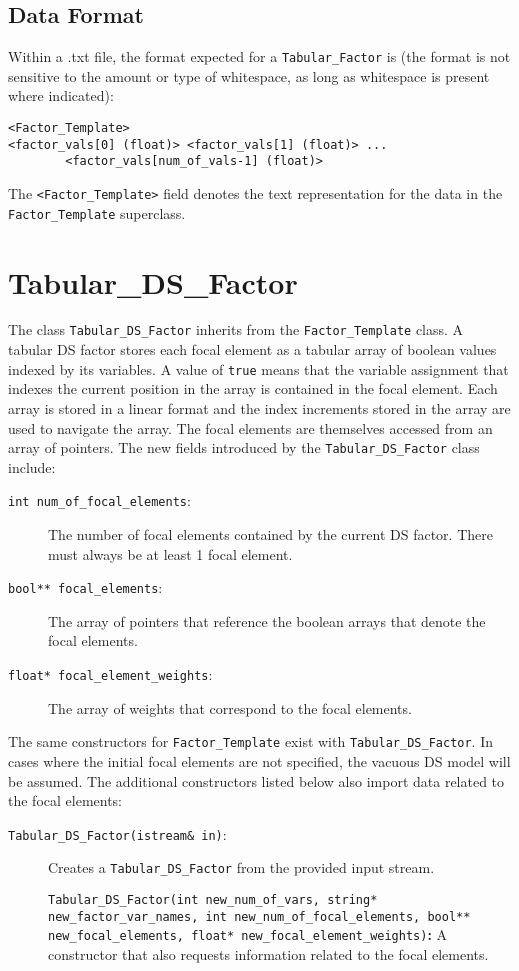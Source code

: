 \documentclass{article}
\begin{document}
\subsection{Data Format}

Within a .txt file, the format expected for a \texttt{Tabular\_Factor} is (the format is not sensitive to the amount or type of whitespace, as long as whitespace is present where indicated):
\begin{verbatim}
<Factor_Template>
<factor_vals[0] (float)> <factor_vals[1] (float)> ... 
        <factor_vals[num_of_vals-1] (float)>
\end{verbatim}
The \texttt{<Factor\_Template>} field denotes the text representation for the data in the \texttt{Factor\_Template} superclass.




\section{Tabular\_DS\_Factor}

The class \texttt{Tabular\_DS\_Factor} inherits from the \texttt{Factor\_Template} class. A tabular DS factor stores each focal element as a tabular array of boolean values indexed by its variables. A value of \texttt{true} means that the variable assignment that indexes the current position in the array is contained in the focal element. Each array is stored in a linear format and the index increments stored in the array  are used to navigate the array. The focal elements are themselves accessed from an array of pointers. The new fields introduced by the \texttt{Tabular\_DS\_Factor} class include:

\begin{description}
\item[\texttt{int num\_of\_focal\_elements}:] The number of focal elements contained by the current DS factor. There must always be at least 1 focal element.
\item[\texttt{bool** focal\_elements}:] The array of pointers that reference the boolean arrays that denote the focal elements.
\item[\texttt{float* focal\_element\_weights}:] The array of weights that correspond to the focal elements.
\end{description}

The same constructors for \texttt{Factor\_Template} exist with \texttt{Tabular\_DS\_Factor}. In cases where the initial focal elements are not specified, the vacuous DS model will be assumed. The additional constructors listed below also import data related to the focal elements:
\begin{description}
\item[\texttt{Tabular\_DS\_Factor(istream\& in)}:] Creates a \texttt{Tabular\_DS\_Factor} from the provided input stream.
\item[]\texttt{Tabular\_DS\_Factor(int new\_num\_of\_vars, string* new\_factor\_var\_names, int new\_num\_of\_focal\_elements, bool** new\_focal\_elements, float* new\_focal\_element\_weights)}\textbf{:} A constructor that also requests information related to the focal elements.
\end{description}
\end{document}
